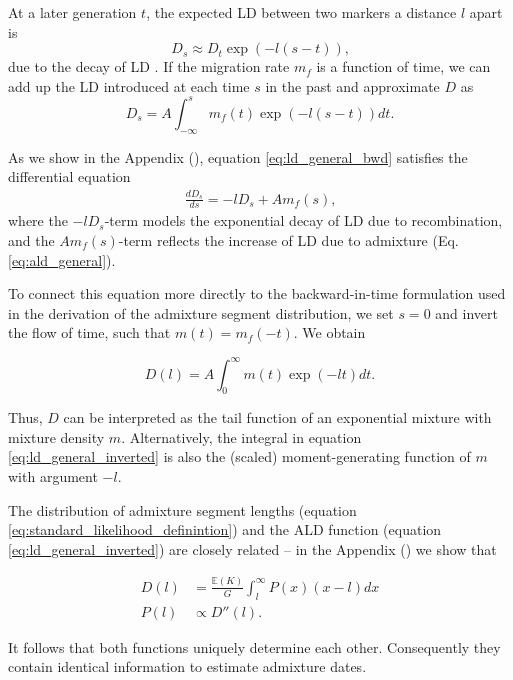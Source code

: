 \documentclass[11pt]{article}
\begin{document}
At a later generation $t$, the expected LD between two markers a distance $l$ apart is
\begin{equation}
    D_s \approx D_t \exp(-l(s-t))\text{,}
\end{equation}
due to the decay of LD \cite[e.g.][]{sankararaman_date_2012}. If the  migration rate $m_f$ is a function of time, we can add up the LD introduced at each time $s$ in the past and approximate $D$ as 
\begin{equation}
    D_s = A\int_{-\infty}^s m_f(t)\exp(-l(s-t)) dt \text{.} \label{eq:ld_general_bwd}
\end{equation}

As we show in the Appendix (), equation \ref{eq:ld_general_bwd} satisfies the differential equation
\begin{align}
    \frac{dD_s}{ds} = -l D_s + A m_f(s)\text{,}
\end{align}
where the $-l D_s$-term models the exponential decay of LD due to recombination, and the $A m_f(s)$-term reflects the increase of LD due to admixture (Eq. \ref{eq:ald_general}).

To connect this equation more directly to the backward-in-time formulation used in the derivation of the admixture segment distribution, we set $s=0$ and invert the flow of time, such that $m(t) = m_f(-t)$. We obtain

\begin{equation}
\label{eq:ld_general_inverted}
    D(l) = A\int_0^{\infty} m(t)\exp(-lt) dt \text{.} 
\end{equation}

Thus, $D$ can be interpreted as the tail function of an exponential mixture with mixture density $m$. Alternatively, the integral in equation \ref{eq:ld_general_inverted} is also the (scaled) moment-generating function of $m$ with argument $-l$. 

The distribution of admixture segment lengths (equation \ref{eq:standard_likelihood_definintion}) and the ALD function (equation \ref{eq:ld_general_inverted}) are closely related -- in the Appendix () we show that 

\begin{align}
D(l) &= \frac{\mathbb{E}(K)}{G} \int_l^\infty P(x) (x-l) d x \label{eq_fr1}\\
P(l)  &\propto D''(l).
\label{eq_fr2}
\end{align}

It follows that both functions uniquely determine each other. Consequently they contain identical information to estimate admixture dates.
\end{document}
